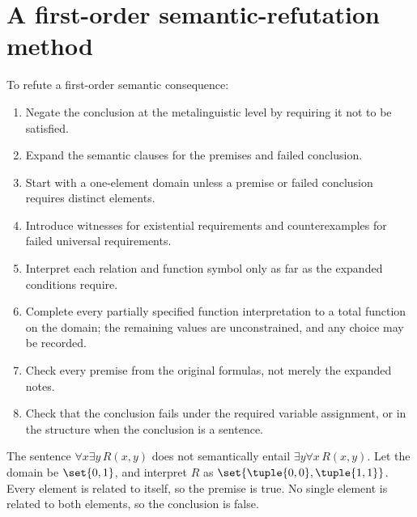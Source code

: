 \section{A first-order semantic-refutation method}
\label{sec:formal-practice-03}

\begin{method}
To refute a first-order semantic consequence:
\begin{enumerate}
  \item Negate the conclusion at the metalinguistic level by requiring it not to
        be satisfied.
  \item Expand the semantic clauses for the premises and failed conclusion.
  \item Start with a one-element domain unless a premise or failed conclusion
        requires distinct elements.
  \item Introduce witnesses for existential requirements and counterexamples
        for failed universal requirements.
  \item Interpret each relation and function symbol only as far as the expanded
        conditions require.
  \item Complete every partially specified function interpretation to a
        total function on the domain; the remaining values are
        unconstrained, and any choice may be recorded.
  \item Check every premise from the original formulas, not merely the expanded
        notes.
  \item Check that the conclusion fails under the required variable assignment,
        or in the structure when the conclusion is a sentence.
\end{enumerate}
\end{method}

\begin{example}
The sentence \(\forall x\exists y\,R(x,y)\) does not semantically entail
\(\exists y\forall x\,R(x,y)\).  Let the domain be \(\set{0,1}\), and
interpret \(R\) as \(\set{\tuple{0,0},\tuple{1,1}}\).  Every element is
related to itself, so the premise is true.  No single element is related to
both elements, so the conclusion is false.
\end{example}

